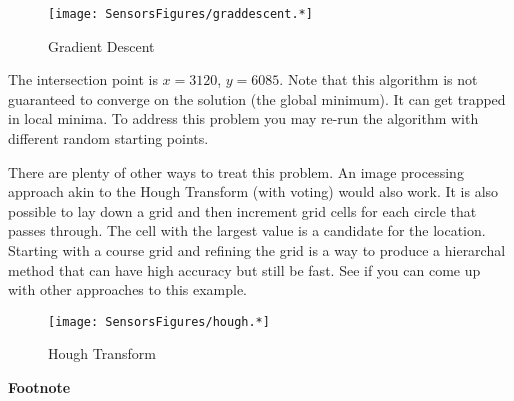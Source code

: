 \begin{Shaded}
\begin{Highlighting}[]
\OperatorTok{=} 
\OperatorTok{=} 
\OperatorTok{=} 
\OperatorTok{=} 

\OperatorTok{\textgreater{}}
\OperatorTok{,}\OperatorTok{=}\OperatorTok{,}
\OperatorTok{=}\OperatorTok{,}
\OperatorTok{=}\OperatorTok{/}
\OperatorTok{=}\OperatorTok{/}
\OperatorTok{,}\OperatorTok{=}\OperatorTok{,}\OperatorTok{,}\OperatorTok{,}\OperatorTok{,}
    \OperatorTok{,}\OperatorTok{\textgreater{}}\OperatorTok{,}
\OperatorTok{=} \OperatorTok{*}
\OperatorTok{,}\OperatorTok{=}\OperatorTok{,}\OperatorTok{,}\OperatorTok{,}\OperatorTok{,}

\OperatorTok{,}\OperatorTok{=}\OperatorTok{,}

\OperatorTok{,}\OperatorTok{,} \OperatorTok{,}
\end{Highlighting}
\end{Shaded}

\begin{figure}
\centering
\texttt{[image: SensorsFigures/graddescent.*]}
\caption{Gradient Descent}
\end{figure}

The intersection point is \(x = 3120\), \(y = 6085\). Note that this
algorithm is not guaranteed to converge on the solution (the global
minimum). It can get trapped in local minima. To address this problem
you may re-run the algorithm with different random starting points.

There are plenty of other ways to treat this problem. An image
processing approach akin to the Hough Transform (with voting) would also
work. It is also possible to lay down a grid and then increment grid
cells for each circle that passes through. The cell with the largest
value is a candidate for the location. Starting with a course grid and
refining the grid is a way to produce a hierarchal method that can have
high accuracy but still be fast. See if you can come up with other
approaches to this example.

\begin{figure}
\centering
\texttt{[image: SensorsFigures/hough.*]}
\caption{Hough Transform}
\end{figure}

\textbf{Footnote}
